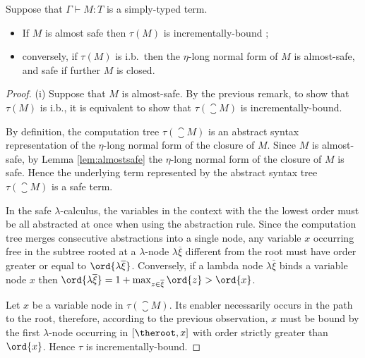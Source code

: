 \begin{lemma}
\label{lem:incrbound_iff_etanf_safe} Suppose that  $\Gamma \vdash M
:T$ is a simply-typed term.
\begin{itemize}
\item[(i)] If $M$ is almost safe then $\tau(M)$ is incrementally-bound ;
\item[(ii)] conversely, if $\tau(M)$ is i.b.\ then the $\eta$-long normal form of $M$ is almost-safe, and safe if further $M$ is closed.
\end{itemize}
\end{lemma}
\begin{proof}
(i) Suppose that $M$ is almost-safe. By the previous remark,
to show that $\tau(M)$ is i.b., it is equivalent to show that
$\tau(\closure{M})$ is incrementally-bound.

By definition, the computation tree $\tau(\closure{M})$ is
an abstract syntax representation of the $\eta$-long normal form of the closure of $M$.
Since $M$ is almost-safe, by Lemma \ref{lem:almostsafe} the
$\eta$-long normal form of the closure of $M$ is safe.
Hence the underlying term represented by the abstract syntax tree $\tau(\closure{M})$ is a safe term.

In the safe $\lambda$-calculus, the variables in the context with
the the lowest order must be all abstracted at once when using the
abstraction rule. Since the computation tree merges consecutive
abstractions into a single node, any variable $x$ occurring free in
the subtree rooted at a $\lambda$-node $\lambda \overline{\xi}$
different from the root must have order greater or equal to
$\ord{\lambda \overline{\xi}}$. Conversely, if a lambda node
$\lambda \overline{\xi}$ binds a variable node $x$ then
$\ord{\lambda \overline{\xi}} = 1+\max_{z\in\overline{\xi}} \ord{z}
> \ord{x}$.

Let $x$ be a variable node in $\tau(\closure{M})$.
Its enabler necessarily occurs in the path to the root, therefore, according to the previous observation,
$x$ must be bound by the first $\lambda$-node occurring in $[\theroot,x]$
with order strictly greater than $\ord{x}$. Hence $\tau$ is incrementally-bound.


\end{proof}
